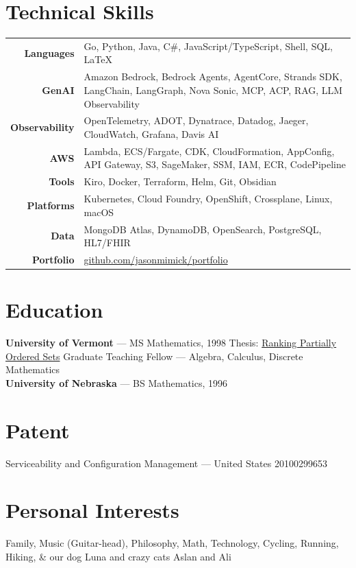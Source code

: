\documentclass[10pt,letterpaper]{article}
\begin{document}
\section{Technical Skills}
\begin{tabularx}{\textwidth}{@{}r X@{}}
{\small\bfseries\color{accent} Languages} & {\small Go, Python, Java, C\#, JavaScript/TypeScript, Shell, SQL, \LaTeX} \\
{\small\bfseries\color{accent} GenAI} & {\small Amazon Bedrock, Bedrock Agents, AgentCore, Strands SDK, LangChain, LangGraph, Nova Sonic, MCP, ACP, RAG, LLM Observability} \\
{\small\bfseries\color{accent} Observability} & {\small OpenTelemetry, ADOT, Dynatrace, Datadog, Jaeger, CloudWatch, Grafana, Davis AI} \\
{\small\bfseries\color{accent} AWS} & {\small Lambda, ECS/Fargate, CDK, CloudFormation, AppConfig, API Gateway, S3, SageMaker, SSM, IAM, ECR, CodePipeline} \\
{\small\bfseries\color{accent} Tools} & {\small Kiro, Docker, Terraform, Helm, Git, Obsidian} \\
{\small\bfseries\color{accent} Platforms} & {\small Kubernetes, Cloud Foundry, OpenShift, Crossplane, Linux, macOS} \\
{\small\bfseries\color{accent} Data} & {\small MongoDB Atlas, DynamoDB, OpenSearch, PostgreSQL, HL7/FHIR} \\
{\small\bfseries\color{accent} Portfolio} & {\small \href{https://github.com/jasonmimick/portfolio}{github.com/jasonmimick/portfolio}} \\
\end{tabularx}

\section{Education}
\textbf{University of Vermont} --- MS Mathematics, 1998 \enspace\textbar\enspace Thesis: \href{http://citeseerx.ist.psu.edu/viewdoc/download?doi=10.1.1.28.2960&rep=rep1&type=pdf}{Ranking Partially Ordered Sets} \enspace\textbar\enspace Graduate Teaching Fellow --- Algebra, Calculus, Discrete Mathematics\\
\textbf{University of Nebraska} --- BS Mathematics, 1996

\section{Patent}
{\small Serviceability and Configuration Management --- United States 20100299653}

\section{Personal Interests}
{\small Family, Music (Guitar-head), Philosophy, Math, Technology, Cycling, Running, Hiking, \& our dog Luna and crazy cats Aslan and Ali}
\end{document}
